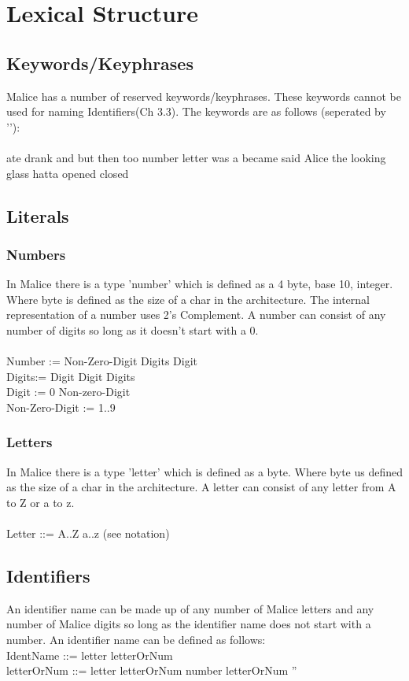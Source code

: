 \documentclass[10pt]{article}
\begin{document}
  \section{Lexical Structure}
  \subsection{Keywords/Keyphrases}
  Malice has a number of reserved keywords/keyphrases. These keywords cannot be used for naming Identifiers(Ch 3.3). The keywords are as follows (seperated by '\textbar'):
  \\ 
  \\
  ate \textbar \space 
  drank \textbar \space  
  and \textbar \space 
  but \textbar \space 
  then \textbar \space 
  too \textbar \space 
  number \textbar \space 
  letter \textbar \space 
  was a \textbar \space 
  became  \textbar \space 
  said Alice \textbar \space 
  the looking glass hatta \textbar \space 
  opened \textbar \space 
  closed
  \subsection{Literals}
  \subsubsection{Numbers}
  In Malice there is a type 'number' which is defined as a 4 byte, base 10, integer. Where byte is defined as the size of a char in the architecture. The internal representation of a number uses 2's Complement. A number can consist of any number of digits so long as it doesn't start with a 0. 
  \\
  \\
  Number := Non-Zero-Digit Digits \textbar \space Digit  
  \\
  Digits:= Digit \textbar \space Digit Digits
  \\
  Digit := 0 \textbar \space Non-zero-Digit
  \\
  Non-Zero-Digit := 1..9
  \subsubsection{Letters}
  In Malice there is a type 'letter' which is defined as a byte. Where byte us defined as the size of a char in the architecture. A letter can consist of any letter from A to Z or a to z.
 \\
 \\
 Letter ::= A..Z \textbar \space a..z (see notation)
  \subsection{Identifiers}
  An identifier name can be made up of any number of Malice letters and any number of Malice digits so long as the identifier name does not start with a number. An identifier name can be defined as follows:
  \\
  IdentName ::= letter letterOrNum
  \\
  letterOrNum ::= letter letterOrNum \textbar \space number letterOrNum \textbar \space ''
\end{document}
